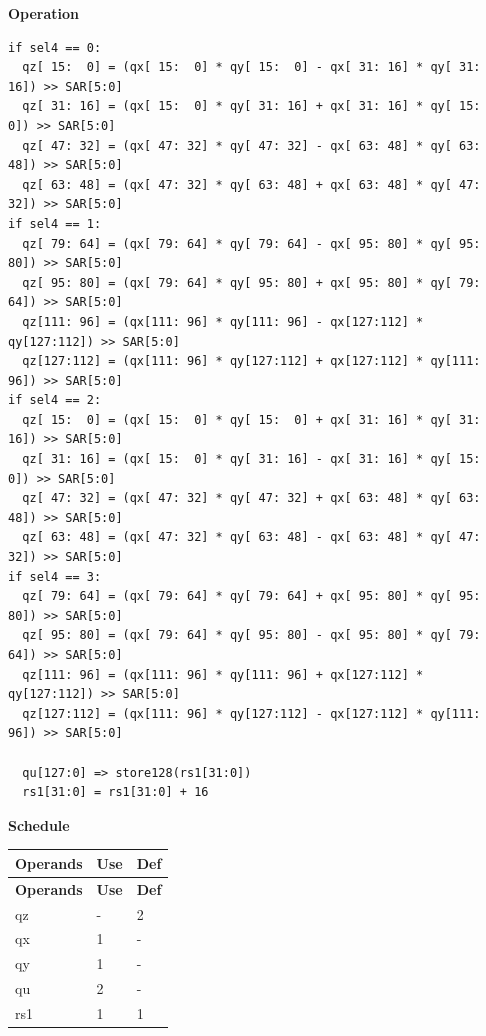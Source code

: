 \textbf{Operation}\\
\begin{lstlisting}
if sel4 == 0:
  qz[ 15:  0] = (qx[ 15:  0] * qy[ 15:  0] - qx[ 31: 16] * qy[ 31: 16]) >> SAR[5:0]
  qz[ 31: 16] = (qx[ 15:  0] * qy[ 31: 16] + qx[ 31: 16] * qy[ 15:  0]) >> SAR[5:0]
  qz[ 47: 32] = (qx[ 47: 32] * qy[ 47: 32] - qx[ 63: 48] * qy[ 63: 48]) >> SAR[5:0]
  qz[ 63: 48] = (qx[ 47: 32] * qy[ 63: 48] + qx[ 63: 48] * qy[ 47: 32]) >> SAR[5:0]
if sel4 == 1:
  qz[ 79: 64] = (qx[ 79: 64] * qy[ 79: 64] - qx[ 95: 80] * qy[ 95: 80]) >> SAR[5:0]
  qz[ 95: 80] = (qx[ 79: 64] * qy[ 95: 80] + qx[ 95: 80] * qy[ 79: 64]) >> SAR[5:0]
  qz[111: 96] = (qx[111: 96] * qy[111: 96] - qx[127:112] * qy[127:112]) >> SAR[5:0]
  qz[127:112] = (qx[111: 96] * qy[127:112] + qx[127:112] * qy[111: 96]) >> SAR[5:0]
if sel4 == 2:
  qz[ 15:  0] = (qx[ 15:  0] * qy[ 15:  0] + qx[ 31: 16] * qy[ 31: 16]) >> SAR[5:0]
  qz[ 31: 16] = (qx[ 15:  0] * qy[ 31: 16] - qx[ 31: 16] * qy[ 15:  0]) >> SAR[5:0]
  qz[ 47: 32] = (qx[ 47: 32] * qy[ 47: 32] + qx[ 63: 48] * qy[ 63: 48]) >> SAR[5:0]
  qz[ 63: 48] = (qx[ 47: 32] * qy[ 63: 48] - qx[ 63: 48] * qy[ 47: 32]) >> SAR[5:0]
if sel4 == 3:
  qz[ 79: 64] = (qx[ 79: 64] * qy[ 79: 64] + qx[ 95: 80] * qy[ 95: 80]) >> SAR[5:0]
  qz[ 95: 80] = (qx[ 79: 64] * qy[ 95: 80] - qx[ 95: 80] * qy[ 79: 64]) >> SAR[5:0]
  qz[111: 96] = (qx[111: 96] * qy[111: 96] + qx[127:112] * qy[127:112]) >> SAR[5:0]
  qz[127:112] = (qx[111: 96] * qy[127:112] - qx[127:112] * qy[111: 96]) >> SAR[5:0]

  qu[127:0] => store128(rs1[31:0])
  rs1[31:0] = rs1[31:0] + 16
\end{lstlisting}

\textbf{Schedule}\\
\begin{longtable}[c]{|l|l|l|}
    \hline
    \rowcolor{lightgray}
    \textbf{Operands} & \textbf{Use} & \textbf{Def} \\\hline
    \endfirsthead
    \hline
    \rowcolor{lightgray}
     \textbf{Operands} & \textbf{Use} & \textbf{Def} \\\hline
    \endhead
    \hline
    \endfoot


    qz & - & 2 \\\hline
     qx & 1 & - \\\hline
     qy & 1 & - \\\hline
     qu & 2 & - \\\hline
     rs1 & 1 & 1

\end{longtable}

